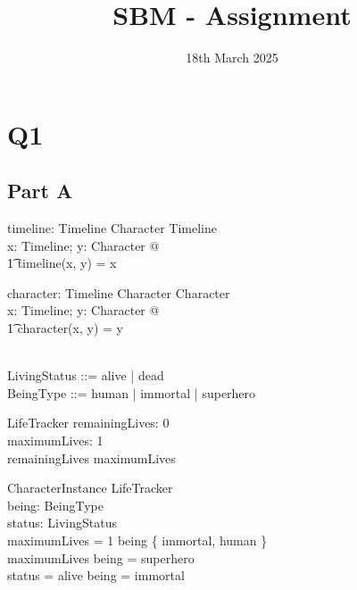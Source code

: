 \documentclass{article}
\title{SBM - Assignment}
\date{\vspace{-1.0cm}18th March 2025}
\begin{document}
\maketitle

\pagebreak 

\section*{Q1}

\subsection*{Part A}

\begin{axdef}
timeline: Timeline \cross Character \fun Timeline \\
\where
\forall x: Timeline; y: Character @ \\
\t1 timeline(x, y) = x \\
\end{axdef}

\begin{axdef}
character: Timeline \cross Character \fun Character \\
\where
\forall x: Timeline; y: Character @ \\
\t1 character(x, y) = y \\
\end{axdef} 

\begin{zed}
 \\
LivingStatus ::= alive | dead \\
BeingType ::= human | immortal | superhero \\
\end{zed}

\begin{schema}{LifeTracker}
remainingLives:  0  \\ 
maximumLives: 1  \\ 
\where
remainingLives \leq maximumLives \\
\end{schema}

\begin{schema}{CharacterInstance}
LifeTracker \\ 
being: BeingType \\
status: LivingStatus \\
\where  
maximumLives = 1 \iff being \in \{ immortal, human \} \\
maximumLives  \iff being = superhero \\
status = alive \iff being = immortal \\ 
\end{schema}
\end{document}
